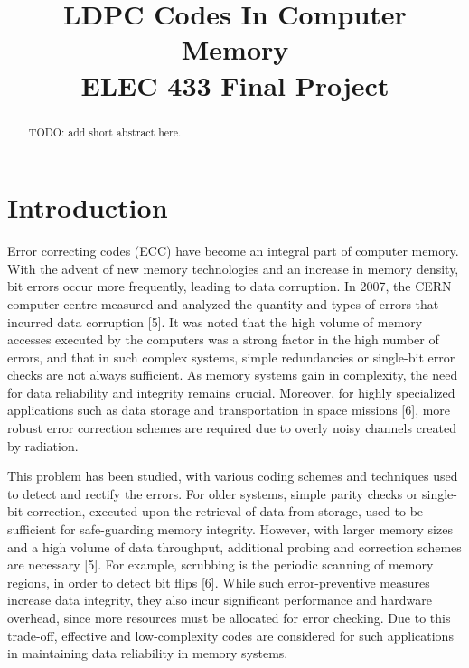 \documentclass[conference]{IEEEtran}
\begin{document}
\title{LDPC Codes In Computer Memory\\
{\large ELEC 433 Final Project}
}

\author{
  \and
}

\maketitle

\begin{abstract}
  TODO: add short abstract here.
\end{abstract}

\section{Introduction}
Error correcting codes (ECC) have become an integral part of computer memory.
With the advent of new memory technologies and an increase in memory density, bit errors occur more frequently, leading to data corruption.
In 2007, the CERN computer centre measured and analyzed the quantity and types of errors that incurred data corruption [5].
It was noted that the high volume of memory accesses executed by the computers was a strong factor in the high number of errors, and that in such complex systems, simple redundancies or single-bit error checks are not always sufficient.
As memory systems gain in complexity, the need for data reliability and integrity remains crucial.
Moreover, for highly specialized applications such as data storage and transportation in space missions [6], more robust error correction schemes are required due to overly noisy channels created by radiation.

This problem has been studied, with various coding schemes and techniques used to detect and rectify the errors.
For older systems, simple parity checks or single-bit correction, executed upon the retrieval of data from storage, used to be sufficient for safe-guarding memory integrity.
However, with larger memory sizes and a high volume of data throughput, additional probing and correction schemes are necessary [5].
For example, scrubbing is the periodic scanning of memory regions, in order to detect bit flips [6].
While such error-preventive measures increase data integrity, they also incur significant performance and hardware overhead, since more resources must be allocated for error checking.
Due to this trade-off, effective and low-complexity codes are considered for such applications in maintaining data reliability in memory systems.
\end{document}
